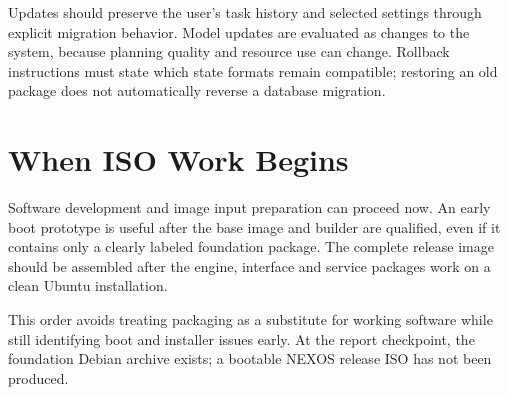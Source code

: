 Updates should preserve the user's task history and selected settings through explicit migration behavior. Model updates are evaluated as changes to the system, because planning quality and resource use can change. Rollback instructions must state which state formats remain compatible; restoring an old package does not automatically reverse a database migration.

\section{When ISO Work Begins}
Software development and image input preparation can proceed now. An early boot prototype is useful after the base image and builder are qualified, even if it contains only a clearly labeled foundation package. The complete release image should be assembled after the engine, interface and service packages work on a clean Ubuntu installation.

This order avoids treating packaging as a substitute for working software while still identifying boot and installer issues early. At the report checkpoint, the foundation Debian archive exists; a bootable NEXOS release ISO has not been produced.
